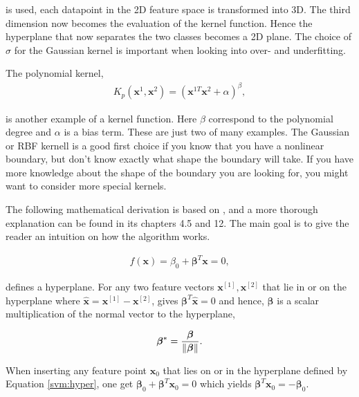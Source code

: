             is used, each datapoint in the 2D feature space is transformed into 3D. The third dimension now becomes the evaluation of the kernel function. Hence the hyperplane that now separates the two classes becomes a 2D plane. The choice of $\sigma$ for the Gaussian kernel is important when looking into over- and underfitting. 
            
            The polynomial kernel,
            \begin{align}
                K_p(\bm x^{1},\bm x^{2}) = (\bm x^{1T}\bm x^{2} + \alpha)^\beta,
                \label{svm:poly}
            \end{align}
            
            is another example of a kernel function. Here $\beta$ correspond to the polynomial degree and $\alpha$ is a bias term. These are just two of many examples. The Gaussian or RBF kernell is a good first choice if you know that you have a nonlinear boundary, but don't know exactly what shape the boundary will take. If you have more knowledge about the shape of the boundary you are looking for, you might want to consider more special kernels.
            
            The following mathematical derivation is based on \cite{Hastie}, and a more thorough explanation can be found in its chapters 4.5 and 12. The main goal is to give the reader an intuition on how the algorithm works. 
            
            \begin{align}
                f(\bm x) = \beta_0 + \bm \beta^T\bm x = 0,
                \label{svm:hyper}
            \end{align}
            
            
            defines a hyperplane. For any two feature vectors $\bm x^{[1]},\bm x^{[2]}$ that lie in or on the hyperplane where $\bm \hat x = \bm x^{[1]} - \bm x^{[2]}$, gives  $\bm \beta^T \bm \hat x = 0 $ and hence, $\bm \beta$ is a scalar multiplication of the normal vector to the hyperplane, 
            
            
            \begin{align}
                \bm \beta^* = \frac{\bm \beta}{\lVert\bm \beta\rVert}.
                \label{svm:norm}
            \end{align}
            
             When inserting any feature point $\bm x_0$ that lies on or in the hyperplane defined by Equation \ref{svm:hyper}, one get $\bm \beta_0 + \bm \beta^T\bm x_0 = 0$ which yields $\bm \beta^T\bm x_0 = -\bm \beta_0$. 
            
